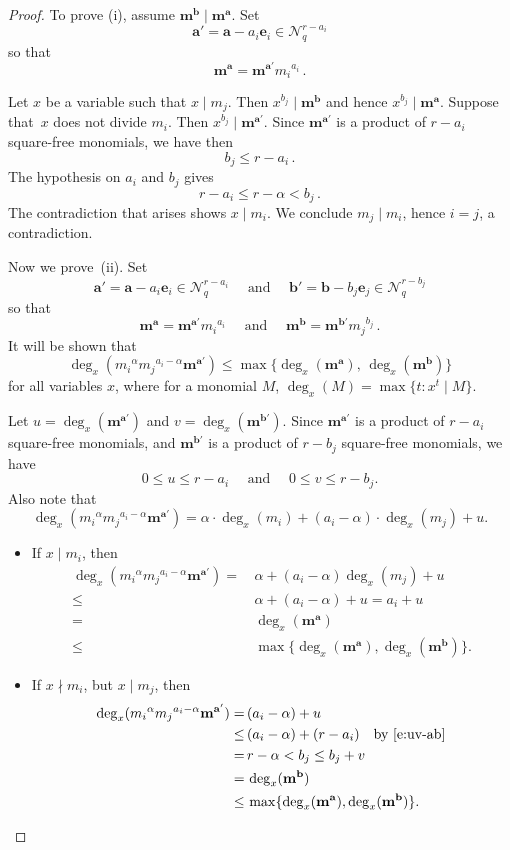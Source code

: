 \documentclass[11pt]{article}
\theoremstyle{definition}
\numberwithin{equation}{section}
\newcommand{\N}{\mathcal{N}}
\newcommand{\st}{\colon}
\newcommand{\m}{\mathbf{m}}
\newcommand{\ba}{\mathbf{a}}
\newcommand{\bb}{\mathbf{b}}
\newcommand{\be}{\mathbf{e}}
\newcommand{\bma}{\mathbf{m}^\ba}
\newcommand{\bmb}{\mathbf{m}^\bb}
\newcommand{\qand}{\quad \mbox{ and } \quad }
\begin{document}
\begin{proof} To prove \textup{(}i\textup{)}, 
assume $\bmb\mid \bma$. Set
$$
\ba'=\ba-a_i\be_i\in \N^{r-a_i}_q
$$
so that $$\bma=\m^{\ba'}{m_i}^{a_i}\,. $$

Let $x$ be a variable such that  $x\mid m_j$. Then $x^{b_j} \mid \bmb$ and hence $x^{b_j}\mid \bma$.  Suppose that~$x$ does not divide $m_i$. Then $x^{b_j}\mid\m^{\ba'}$. Since $\m^{\ba'}$ is a product of $r-a_i$ square-free monomials, we have then 
$$
b_j\le r-a_i\,.
$$
The hypothesis on $a_i$ and $b_j$ gives 
$$r-a_i\le r-\alpha< b_j\,.$$
The  contradiction that arises shows $x\mid m_i$. 
 We conclude $m_j\mid m_i$, hence $i=j$, a contradiction. 

 Now we prove~\textup{(}ii\textup{)}. 
Set 
$$ \ba'=\ba-a_i\be_i\in \N^{r-a_i}_q \qand \bb'=\bb-b_j\be_j\in
\N^{r-b_j}_q
$$
so that $$\bma=\m^{\ba'}{m_i}^{a_i}\qand \bmb=\m^{\bb'}{m_j}^{b_j}\,.$$
  It
  will be shown that 
$$\deg_x({m_i}^{\alpha}{m_j}^{a_i-\alpha}\m^{\ba'}) \leq \max\{ \deg_x(\bma), \,
  \deg_x(\bmb)\}$$ for all variables $x$, where for a monomial $M$, $\deg_x(M) = \max\{t
  \st x^t \mid M\}.$
    
Let $u = \deg_x(\m^{\ba'})$ and  $v=\deg_x(\m^{\bb'})$.  Since  $\m^{\ba'}$ is a product of $r-a_i$ square-free monomials, and $\m^{\bb'}$ is a product of $r-b_j$ square-free monomials, we have 
\begin{equation}\label{e:uv-ab}
  0 \le u \le r-a_i\qand 0 \le v \le r-b_j.
\end{equation}
Also note that
  $$\deg_x({m_i}^{\alpha}{m_j}^{a_i-\alpha}\m^{\ba'}) = \alpha \cdot \deg_x(m_i)+ (a_i-\alpha)\cdot \deg_x(m_j)+ u.$$

\begin{itemize}
  \item If $x \mid m_i$, then  
    \begin{align*}
      \deg_x({m_i}^{\alpha}{m_j}^{a_i-\alpha}\m^{\ba'}) = & \, \alpha+  (a_i-\alpha)\deg_x(m_j) + u\\
      \leq & \, \alpha+  (a_i-\alpha) + u
      = a_i+u\\
      = & \, \deg_x(\bma) \\
      \leq & \, \max \{ \deg_x(\bma), \deg_x(\bmb) \}.
    \end{align*}

   \item If $x \nmid m_i$, but $x \mid m_j$, then 
     \begin{align*}
     \deg_x({m_i}^{\alpha}{m_j}^{a_i-\alpha}\m^{\ba'}) = & \, (a_i-\alpha) + u\\
      \leq  & \, (a_i-\alpha) + (r-a_i)  \quad \mbox{by \eqref{e:uv-ab}}\\
      = & \, r-\alpha<  b_j \le  b_j+v \\
      = & \, \deg_x(\bmb)\\
      \leq & \, \max \{ \deg_x(\bma), \deg_x(\bmb) \}.
    \end{align*}
  

\end{itemize}
\end{proof}
\end{document}
